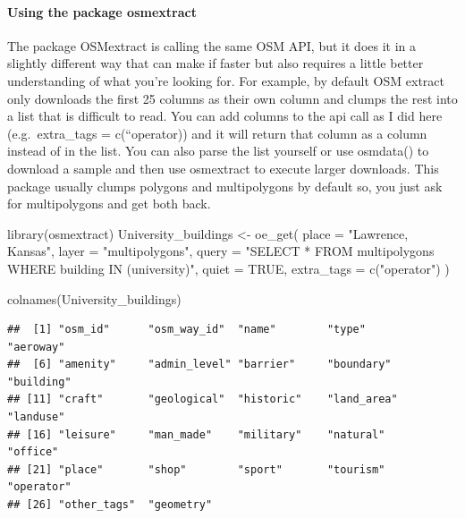 \documentclass[
  paper=a4,
  ,captions=tableheading
]{scrartcl}
\newenvironment{Shaded}{\begin{snugshade}}{\end{snugshade}}
\newcommand{\AttributeTok}[1]{\textcolor[rgb]{0.77,0.63,0.00}{#1}}
\newcommand{\ConstantTok}[1]{\textcolor[rgb]{0.00,0.00,0.00}{#1}}
\newcommand{\FunctionTok}[1]{\textcolor[rgb]{0.00,0.00,0.00}{#1}}
\newcommand{\NormalTok}[1]{#1}
\newcommand{\OtherTok}[1]{\textcolor[rgb]{0.56,0.35,0.01}{#1}}
\newcommand{\StringTok}[1]{\textcolor[rgb]{0.31,0.60,0.02}{#1}}
\begin{document}
\hypertarget{using-the-package-osmextract}{%
\paragraph{Using the package
osmextract}\label{using-the-package-osmextract}}

The package OSMextract is calling the same OSM API, but it does it in a
slightly different way that can make if faster but also requires a
little better understanding of what you're looking for. For example, by
default OSM extract only downloads the first 25 columns as their own
column and clumps the rest into a list that is difficult to read. You
can add columns to the api call as I did here (e.g.~extra\_tags =
c(``operator)) and it will return that column as a column instead of in
the list. You can also parse the list yourself or use osmdata() to
download a sample and then use osmextract to execute larger downloads.
This package usually clumps polygons and multipolygons by default so,
you just ask for multipolygons and get both back.

\begin{Shaded}
\begin{Highlighting}[]
\FunctionTok{library}\NormalTok{(osmextract)}
\NormalTok{University\_buildings }\OtherTok{\textless{}{-}} \FunctionTok{oe\_get}\NormalTok{(}
  \AttributeTok{place =} \StringTok{"Lawrence, Kansas"}\NormalTok{, }
  \AttributeTok{layer =} \StringTok{"multipolygons"}\NormalTok{,}
  \AttributeTok{query =} \StringTok{"SELECT * FROM multipolygons WHERE building IN (\textquotesingle{}university\textquotesingle{})"}\NormalTok{,}
  \AttributeTok{quiet =} \ConstantTok{TRUE}\NormalTok{,}
  \AttributeTok{extra\_tags =} \FunctionTok{c}\NormalTok{(}\StringTok{"operator"}\NormalTok{)}
\NormalTok{)}

\FunctionTok{colnames}\NormalTok{(University\_buildings)}
\end{Highlighting}
\end{Shaded}

\begin{verbatim}
##  [1] "osm_id"      "osm_way_id"  "name"        "type"        "aeroway"    
##  [6] "amenity"     "admin_level" "barrier"     "boundary"    "building"   
## [11] "craft"       "geological"  "historic"    "land_area"   "landuse"    
## [16] "leisure"     "man_made"    "military"    "natural"     "office"     
## [21] "place"       "shop"        "sport"       "tourism"     "operator"   
## [26] "other_tags"  "geometry"
\end{verbatim}
\end{document}
